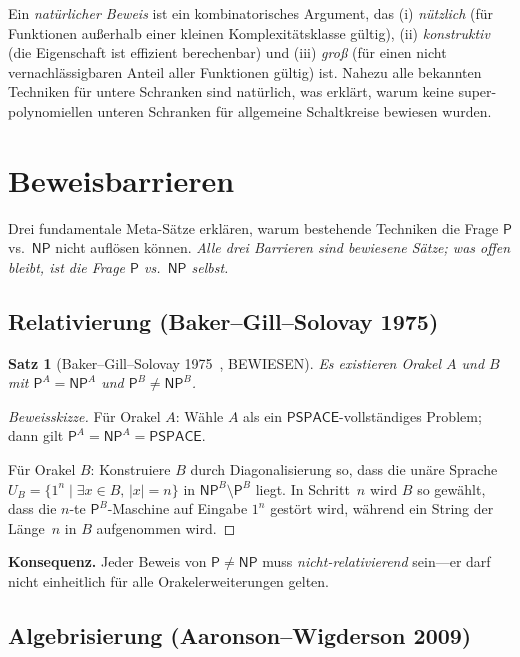 \documentclass[12pt,a4paper]{amsart}
\newtheorem{theorem}{Satz}[section]
\theoremstyle{definition}
\newcommand{\Pclass}{\mathsf{P}}
\newcommand{\NP}{\mathsf{NP}}
\newcommand{\PSPACE}{\mathsf{PSPACE}}
\begin{document}
Ein \emph{natürlicher Beweis} ist ein kombinatorisches Argument, das
(i) \emph{nützlich} (für Funktionen außerhalb einer kleinen Komplexitätsklasse
gültig), (ii) \emph{konstruktiv} (die Eigenschaft ist effizient berechenbar)
und (iii) \emph{groß} (für einen nicht vernachlässigbaren Anteil aller
Funktionen gültig) ist.  Nahezu alle bekannten Techniken für untere Schranken
sind natürlich, was erklärt, warum keine super-polynomiellen unteren Schranken
für allgemeine Schaltkreise bewiesen wurden.

\section{Beweisbarrieren}
\label{sec:barrieren}

Drei fundamentale Meta-Sätze erklären, warum bestehende Techniken die Frage
$\Pclass$ vs.\ $\NP$ nicht auflösen können.  \emph{Alle drei Barrieren sind
bewiesene Sätze; was offen bleibt, ist die Frage $\Pclass$ vs.\ $\NP$ selbst.}

\subsection{Relativierung (Baker--Gill--Solovay 1975)}

\begin{theorem}[Baker--Gill--Solovay 1975~\cite{baker1975}, BEWIESEN]
Es existieren Orakel $A$ und $B$ mit $\Pclass^A = \NP^A$ und
$\Pclass^B \neq \NP^B$.
\end{theorem}

\begin{proof}[Beweisskizze]
Für Orakel $A$: Wähle $A$ als ein $\PSPACE$-vollständiges Problem; dann gilt
$\Pclass^A = \NP^A = \PSPACE$.

Für Orakel $B$: Konstruiere $B$ durch Diagonalisierung so, dass die unäre
Sprache $U_B = \{1^n \mid \exists x\in B,\,|x|=n\}$ in
$\NP^B\setminus\Pclass^B$ liegt.  In Schritt~$n$ wird $B$ so gewählt, dass
die $n$-te $\Pclass^B$-Maschine auf Eingabe $1^n$ gestört wird, während ein
String der Länge~$n$ in $B$ aufgenommen wird.
\end{proof}

\textbf{Konsequenz.}  Jeder Beweis von $\Pclass\neq\NP$ muss
\emph{nicht-relativierend} sein---er darf nicht einheitlich für alle
Orakelerweiterungen gelten.

\subsection{Algebrisierung (Aaronson--Wigderson 2009)}
\end{document}
